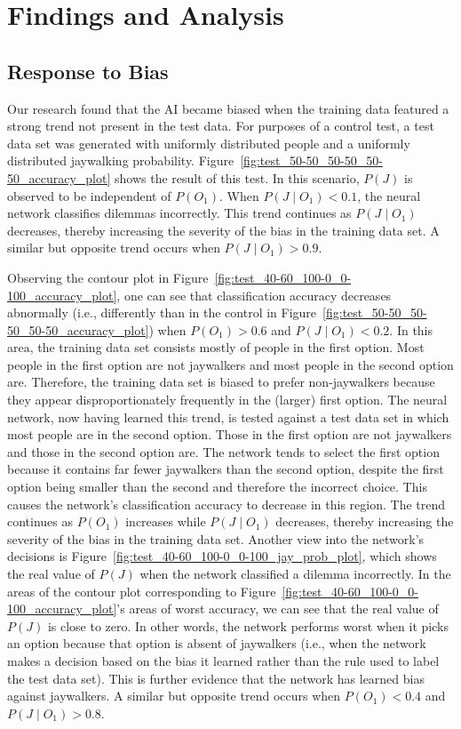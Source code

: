 \documentclass[paper=a4paper]{report}
\begin{document}
\FloatBarrier
\chapter{Findings and Analysis}

\section{Response to Bias}

Our research found that the AI became biased when the training data featured a strong trend not
present in the test data. For purposes of a control test, a test data set was generated with
uniformly distributed people and a uniformly distributed jaywalking probability.
Figure~\ref{fig:test_50-50_50-50_50-50_accuracy_plot} shows the result of this test. In this
scenario, $P(J)$ is observed to be independent of $P(O_1)$. When $P(J \mid O_1) < 0.1$, the neural
network classifies dilemmas incorrectly. This trend continues as $P(J \mid O_1)$ decreases, thereby
increasing the severity of the bias in the training data set. A similar but opposite trend occurs
when $P(J \mid O_1) > 0.9$.

Observing the contour plot in Figure~\ref{fig:test_40-60_100-0_0-100_accuracy_plot}, one can see
that classification accuracy decreases abnormally (i.e., differently than in the control in
Figure~\ref{fig:test_50-50_50-50_50-50_accuracy_plot}) when $P(O_1) > 0.6$ and $P(J \mid O_1) <
0.2$. In this area, the training data set consists mostly of people in the first option. Most people
in the first option are not jaywalkers and most people in the second option are. Therefore, the
training data set is biased to prefer non-jaywalkers because they appear disproportionately
frequently in the (larger) first option. The neural network, now having learned this trend, is
tested against a test data set in which most people are in the second option. Those in the first
option are not jaywalkers and those in the second option are. The network tends to select the first
option because it contains far fewer jaywalkers than the second option, despite the first option
being smaller than the second and therefore the incorrect choice. This causes the network's
classification accuracy to decrease in this region. The trend continues as $P(O_1)$ increases while
$P(J \mid O_1)$ decreases, thereby increasing the severity of the bias in the training data set.
Another view into the network's decisions is Figure~\ref{fig:test_40-60_100-0_0-100_jay_prob_plot},
which shows the real value of $P(J)$ when the network classified a dilemma incorrectly. In the areas
of the contour plot corresponding to Figure~\ref{fig:test_40-60_100-0_0-100_accuracy_plot}'s areas
of worst accuracy, we can see that the real value of $P(J)$ is close to zero. In other words, the
network performs worst when it picks an option because that option is absent of jaywalkers (i.e.,
when the network makes a decision based on the bias it learned rather than the rule used to label
the test data set). This is further evidence that the network has learned bias against jaywalkers. A
similar but opposite trend occurs when $P(O_1) < 0.4$ and $P(J \mid O_1) > 0.8$.
\end{document}
